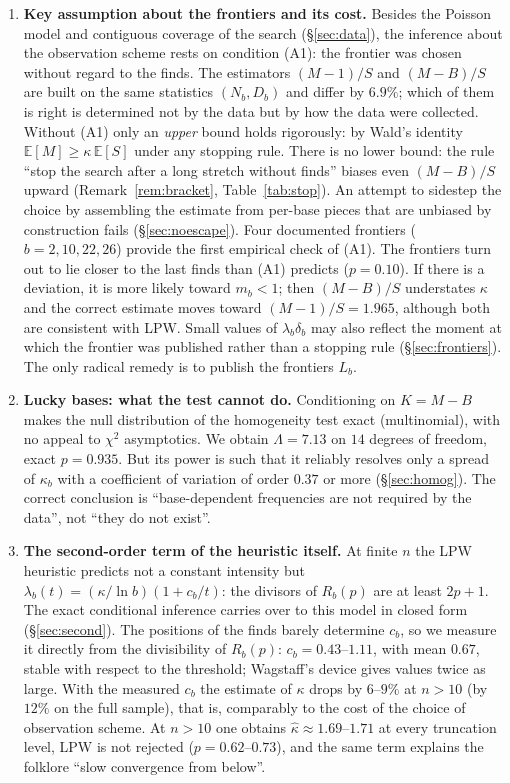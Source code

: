 \documentclass[11pt,a4paper]{article}
\theoremstyle{plain}
\theoremstyle{remark}
\newcommand{\Rb}{R_b}
\begin{document}
\begin{enumerate}
\item\textbf{Key assumption about the frontiers and its cost.} Besides the
Poisson model and contiguous coverage of the search (\S\ref{sec:data}), the
inference about the observation scheme rests on condition (A1): the frontier was
chosen without regard to the finds. The
estimators $(M-1)/S$ and $(M-B)/S$ are built on the same statistics $(N_b,D_b)$
and differ by $6.9\%$; which of them is right is determined not by the data but
by how the data were collected. Without (A1) only an \emph{upper} bound holds
rigorously: by Wald's identity $\mathbb E[M]\ge\kappa\,\mathbb E[S]$ under any
stopping rule. There is no lower bound: the rule ``stop the search after a long
stretch without finds'' biases even $(M-B)/S$ upward
(Remark~\ref{rem:bracket}, Table~\ref{tab:stop}). An attempt to sidestep the
choice by assembling the estimate from per-base pieces that are unbiased by
construction fails (\S\ref{sec:noescape}). Four documented frontiers
($b=2,10,22,26$) provide the first empirical check of (A1). The frontiers turn
out to lie closer to the last finds than (A1) predicts ($p=0.10$). If there is a
deviation, it is more likely toward $m_b<1$; then $(M-B)/S$ understates $\kappa$
and the correct estimate moves toward $(M-1)/S=1.965$, although both are
consistent with LPW. Small values of $\lambda_b\delta_b$ may also reflect the
moment at which the frontier was published rather than a stopping rule
(\S\ref{sec:frontiers}). The only radical remedy is to publish the frontiers
$L_b$.

\item\textbf{Lucky bases: what the test cannot do.} Conditioning on $K=M-B$
makes the null distribution of the homogeneity test exact (multinomial), with
no appeal to $\chi^2$ asymptotics. We obtain $\Lambda=7.13$ on $14$ degrees of
freedom, exact $p=0.935$. But its power is such that it reliably resolves only
a spread of $\kappa_b$ with a coefficient of variation of order $0.37$ or more
(\S\ref{sec:homog}). The correct conclusion is
``base-dependent frequencies are not required by the data'', not ``they do not
exist''.

\item\textbf{The second-order term of the heuristic itself.} At finite $n$ the
LPW heuristic predicts not a constant intensity but
$\lambda_b(t)=(\kappa/\ln b)(1+c_b/t)$: the divisors of $\Rb(p)$ are at least
$2p+1$. The exact conditional inference carries over to this model in closed
form (\S\ref{sec:second}). The positions of the finds barely determine $c_b$, so
we measure it directly from the divisibility of $\Rb(p)$: $c_b=0.43$--$1.11$,
with mean $0.67$, stable with respect to the threshold; Wagstaff's device gives
values twice as large. With the measured $c_b$ the estimate of $\kappa$ drops by
$6$--$9\%$ at $n>10$ (by $12\%$ on the full sample), that is, comparably to the
cost of the choice of observation scheme. At $n>10$ one obtains
$\hat\kappa\approx1.69$--$1.71$ at every truncation level, LPW is not rejected
($p=0.62$--$0.73$), and the same term explains the folklore ``slow convergence
from below''.


\end{enumerate}
\end{document}
